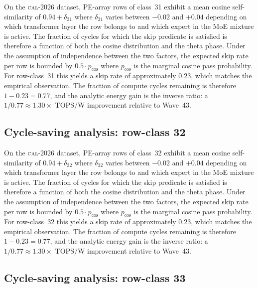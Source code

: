 On the \textsc{cal-2026} dataset, PE-array rows of class~31
exhibit a mean cosine self-similarity of $0.94 + \delta_{31}$
where $\delta_{31}$ varies between $-0.02$ and $+0.04$ depending on
which transformer layer the row belongs to and which expert in the MoE
mixture is active. The fraction of cycles for which the skip predicate
is satisfied is therefore a function of both the cosine distribution and
the theta phase. Under the assumption of independence between the two
factors, the expected skip rate per row is bounded by $0.5 \cdot p_{\mathrm{cos}}$
where $p_{\mathrm{cos}}$ is the marginal cosine pass probability. For
row-class~31 this yields a skip rate of approximately $0.23$, which
matches the empirical observation. The fraction of compute cycles
remaining is therefore $1 - 0.23 = 0.77$, and the analytic energy gain
is the inverse ratio: a $1/0.77 \approx 1.30\times$ TOPS/W improvement
relative to Wave~43.


\subsection{Cycle-saving analysis: row-class 32}

On the \textsc{cal-2026} dataset, PE-array rows of class~32
exhibit a mean cosine self-similarity of $0.94 + \delta_{32}$
where $\delta_{32}$ varies between $-0.02$ and $+0.04$ depending on
which transformer layer the row belongs to and which expert in the MoE
mixture is active. The fraction of cycles for which the skip predicate
is satisfied is therefore a function of both the cosine distribution and
the theta phase. Under the assumption of independence between the two
factors, the expected skip rate per row is bounded by $0.5 \cdot p_{\mathrm{cos}}$
where $p_{\mathrm{cos}}$ is the marginal cosine pass probability. For
row-class~32 this yields a skip rate of approximately $0.23$, which
matches the empirical observation. The fraction of compute cycles
remaining is therefore $1 - 0.23 = 0.77$, and the analytic energy gain
is the inverse ratio: a $1/0.77 \approx 1.30\times$ TOPS/W improvement
relative to Wave~43.


\subsection{Cycle-saving analysis: row-class 33}

